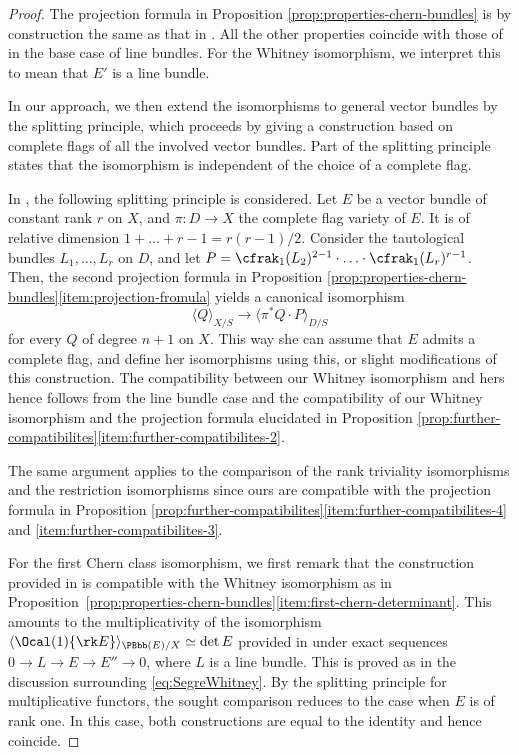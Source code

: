 \begin{proof}
The projection formula in Proposition \ref{prop:properties-chern-bundles} is by construction the same as that in \cite{Elkikfib}. All the other properties coincide with those of \cite{Elkikfib} in the base case of line bundles. For the Whitney isomorphism, we interpret this to mean that $E'$ is a line bundle.

In our approach, we then extend the isomorphisms to general vector bundles by the splitting principle, which proceeds by giving a construction based on complete flags of all the involved vector bundles. Part of the splitting principle states that the isomorphism is independent of the choice of a complete flag.

In \cite[\textsection V.2.3]{Elkikfib}, the following splitting principle is considered. Let $E$ be a vector bundle of constant rank $r$ on $X$, and $\pi\colon D \to X$ the complete flag variety of $E$. It is of relative dimension $1 + \ldots + r-1 = r(r-1)/2$. Consider the tautological bundles $L_1, \ldots, L_{r}$ on $D$, and let $P = \cfrak_1(L_2)^{2-1}\cdot \ldots\cdot \cfrak_1(L_r)^{r-1}$. Then, the second projection formula in Proposition \ref{prop:properties-chern-bundles}\eqref{item:projection-fromula} yields a canonical isomorphism
\begin{displaymath}
\langle Q\rangle_{X/S} \to \langle\pi^{\ast} Q\cdot P\rangle_{D/S}
\end{displaymath}
for every $Q$ of degree $n+1$ on $X$. This way she can assume that $E$ admits a complete flag, and define her isomorphisms using this, or slight modifications of this construction. The compatibility between our Whitney isomorphism and hers hence follows from the line bundle case and the compatibility of our Whitney isomorphism and the projection formula elucidated in Proposition \ref{prop:further-compatibilites}\eqref{item:further-compatibilites-2}.

The same argument applies to the comparison of the rank triviality isomorphisms and the restriction isomorphisms since ours are compatible with the projection formula in Proposition \ref{prop:further-compatibilites}\eqref{item:further-compatibilites-4} and \eqref{item:further-compatibilites-3}.

For the first Chern class isomorphism, we first remark that the construction provided in \cite[\textsection V.1.2 (e)]{Elkikfib} is compatible with the Whitney isomorphism as in Proposition~\ref{prop:properties-chern-bundles}\eqref{item:first-chern-determinant}. This amounts to the multiplicativity of the isomorphism $\langle \Ocal(1)\{\rk E\} \rangle_{\PBbb(E)/X} \simeq \det E$ provided in \cite[Prop.\,IV.3]{Elkikfib} under exact sequences $0 \to L \to E \to E'' \to 0$, where $L$ is a line bundle. This is proved as in the discussion surrounding \eqref{eq:SegreWhitney}. By the splitting principle for multiplicative functors, the sought comparison reduces to the case when $E$ is of rank one. In this case, both constructions are equal to the identity and hence coincide.


\end{proof}
